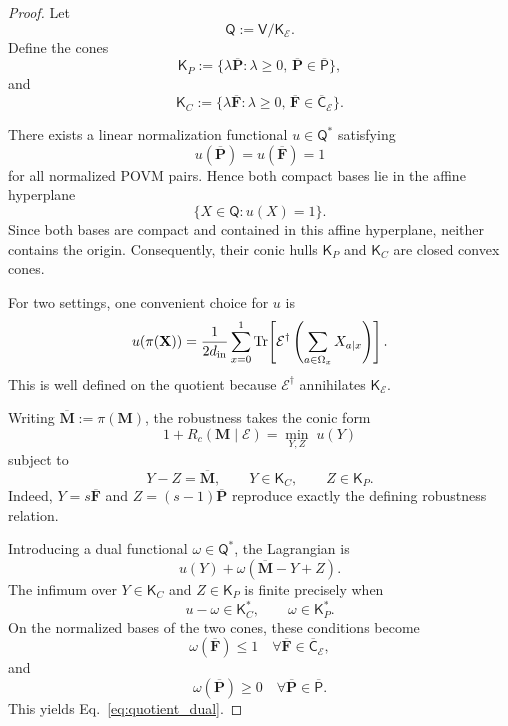 \documentclass[
aps,pra,twocolumn,10pt,
superscriptaddress,longbibliography,floatfix
]{revtex4-2}
\DeclareMathOperator{\Tr}{Tr}
\begin{document}
\begin{proof}
Let
\[
\mathsf Q:=\mathsf V/\mathsf K_{\mathcal E}.
\]
Define the cones
\[
\mathsf K_P
:=
\{\lambda\overline{\mathbf P}:
\lambda\ge0,\,
\overline{\mathbf P}\in\overline{\mathsf P}\},
\]
and
\[
\mathsf K_C
:=
\{\lambda\overline{\mathbf F}:
\lambda\ge0,\,
\overline{\mathbf F}\in
\overline{\mathsf C}_{\mathcal E}\}.
\]

There exists a linear normalization functional $u\in\mathsf Q^*$ satisfying
\[
u(\overline{\mathbf P})=
u(\overline{\mathbf F})=1
\]
for all normalized POVM pairs. Hence both compact bases lie in the affine hyperplane
\[
\{X\in\mathsf Q:u(X)=1\}.
\]
Since both bases are compact and contained in this affine
hyperplane, neither contains the origin. Consequently, their
conic hulls $\mathsf K_P$ and $\mathsf K_C$ are closed convex cones.

For two settings, one convenient choice for $u$ is
\[
u(\pi(\mathbf X))
=
\frac{1}{2d_{\rm in}}
\sum_{x=0}^{1}
\Tr\!\left[
\mathcal E^\dagger
\left(
\sum_{a\in\Omega_x}X_{a|x}
\right)
\right].
\]
This is well defined on the quotient because $\mathcal E^\dagger$ annihilates $\mathsf K_{\mathcal E}$.

Writing $\overline{\mathbf M}:=\pi(\mathbf M)$, the robustness takes the conic form
\[
1+R_c(\mathbf M\mid\mathcal E)
=
\min_{Y,Z}\;u(Y)
\]
subject to
\[
Y-Z=\overline{\mathbf M},
\qquad
Y\in\mathsf K_C,
\qquad
Z\in\mathsf K_P.
\]
Indeed, $Y=s\overline{\mathbf F}$ and $Z=(s-1)\overline{\mathbf P}$ reproduce exactly the defining robustness relation.

Introducing a dual functional $\omega\in\mathsf Q^*$, the Lagrangian is
\[
u(Y)+\omega(\overline{\mathbf M}-Y+Z).
\]
The infimum over $Y\in\mathsf K_C$ and $Z\in\mathsf K_P$ is finite precisely when
\[
u-\omega\in\mathsf K_C^*,
\qquad
\omega\in\mathsf K_P^*.
\]
On the normalized bases of the two cones, these conditions become
\[
\omega(\overline{\mathbf F})\le1
\quad
\forall\overline{\mathbf F}
\in\overline{\mathsf C}_{\mathcal E},
\]
and
\[
\omega(\overline{\mathbf P})\ge0
\quad
\forall\overline{\mathbf P}
\in\overline{\mathsf P}.
\]
This yields Eq.~\eqref{eq:quotient_dual}.


\end{proof}
\end{document}
